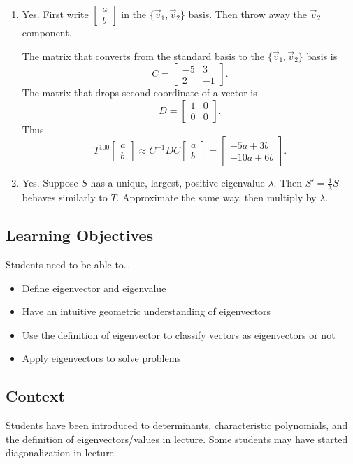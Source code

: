 \documentclass[red]{tutorial}
\newcommand{\R}{\mathbb{R}}
\newcommand{\mat}[1]{\begin{bmatrix} #1 %
\end{bmatrix}}
\theoremstyle{definition}
\theoremstyle{theorem}
\begin{document}
{\begin{solutions}
\begin{enumerate}
\begin{enumerate}
          Finally, a linearly independent set of two vectors in $\R^2$ must span all of $\R^2$,
          and so $\{\vec v_1,\vec v_2\}$ is a basis for $\R^2$.
        \item Yes. First write $\mat{a\\b}$ in the $\{\vec v_1,\vec v_2\}$ basis. Then throw away
          the $\vec v_2$ component.

          The matrix that converts from the standard basis to the $\{\vec v_1,\vec v_2\}$ basis is
          \[
          C=\mat{-5&3\\2&-1}.
          \]
          The matrix that drops second coordinate of a vector is
          \[
          D=\mat{1&0\\0&0}.
          \]
          Thus
          \[
          T^{100}\mat{a\\b} \approx C^{-1}DC\mat{a\\b}=\mat{-5a+3b\\-10a+6b}.
          \]
        \item Yes. Suppose $S$ has a unique, largest, positive eigenvalue $\lambda$. Then $S'=\tfrac{1}{\lambda}S$
          behaves similarly to $T$. Approximate the same way, then multiply by $\lambda$.
      \end{enumerate}
  \end{enumerate}
\end{solutions}
\begin{instructions}
  \subsection*{Learning Objectives}
  Students need to be able to\ldots
  \begin{itemize}
    \item Define eigenvector and eigenvalue
    \item Have an intuitive geometric understanding of eigenvectors
    \item Use the definition of eigenvector to classify vectors as eigenvectors or not
    \item Apply eigenvectors to solve problems
  \end{itemize}

  \subsection*{Context}
  Students have been introduced to determinants, characteristic polynomials, and the definition
  of eigenvectors/values in lecture. Some students may have started diagonalization in
  lecture.


\end{instructions}}
\end{document}
